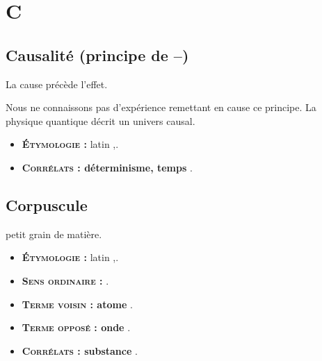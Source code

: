 \chapter{C}
%
\section{Causalité (principe de {\bf --})}

La cause précède l'effet.

Nous ne connaissons pas d'expérience remettant en cause ce principe.
La physique quantique décrit un univers causal.

{\footnotesize
\begin{itemize}[leftmargin=1cm, label=, itemsep=1pt]
\item {\bf \textsc{Étymologie} :} latin {\it },.
\item {\bf \textsc{Corrélats} : déterminisme, temps} .
\end{itemize}
}

%
\section{Corpuscule}

petit grain de matière.

{\footnotesize
\begin{itemize}[leftmargin=1cm, label=, itemsep=1pt]
\item {\bf \textsc{Étymologie} :} latin {\it },.
\item {\bf \textsc{Sens ordinaire} :} .
\item {\bf \textsc{Terme voisin} : atome} .
\item {\bf \textsc{Terme opposé} : onde} .
\item {\bf \textsc{Corrélats} : substance} .
\end{itemize}
}

